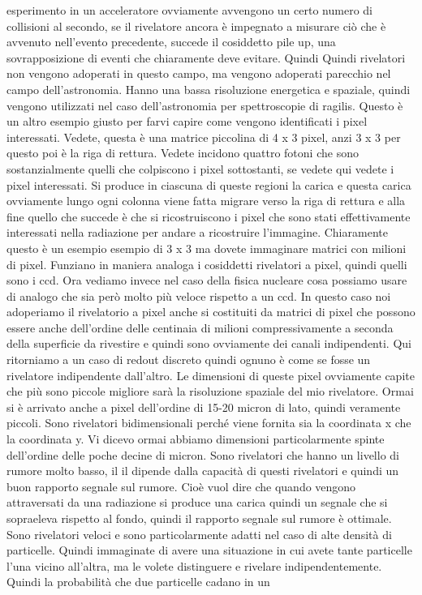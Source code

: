 {esperimento in un acceleratore ovviamente avvengono un certo numero di collisioni al secondo, se il rivelatore ancora è impegnato a misurare ciò che è avvenuto nell'evento precedente, succede il cosiddetto pile up, una sovrapposizione di eventi che chiaramente deve evitare. Quindi Quindi rivelatori non vengono adoperati in questo campo, ma vengono adoperati parecchio nel campo dell'astronomia. Hanno una bassa risoluzione energetica e spaziale, quindi vengono utilizzati nel caso dell'astronomia per spettroscopie di ragilis. Questo è un altro esempio giusto per farvi capire come vengono identificati i pixel interessati. Vedete, questa è una matrice piccolina di 4 x 3 pixel, anzi 3 x 3 per questo poi è la riga di rettura. Vedete incidono quattro fotoni che sono sostanzialmente quelli che colpiscono i pixel sottostanti, se vedete qui vedete i pixel interessati. Si produce in ciascuna di queste regioni la carica e questa carica ovviamente lungo ogni colonna viene fatta migrare verso la riga di rettura e alla fine quello che succede è che si ricostruiscono i pixel che sono stati effettivamente interessati nella radiazione per andare a ricostruire l'immagine. Chiaramente questo è un esempio esempio di 3 x 3 ma dovete immaginare matrici con milioni di pixel. Funziano in maniera analoga i cosiddetti rivelatori a pixel, quindi quelli sono i ccd. Ora vediamo invece nel caso della fisica nucleare cosa possiamo usare di analogo che sia però molto più veloce rispetto a un ccd. In questo caso noi adoperiamo il rivelatorio a pixel anche si costituiti da matrici di pixel che possono essere anche dell'ordine delle centinaia di milioni compressivamente a seconda della superficie da rivestire e quindi sono ovviamente dei canali indipendenti. Qui ritorniamo a un caso di redout discreto quindi ognuno è come se fosse un rivelatore indipendente dall'altro. Le dimensioni di queste pixel ovviamente capite che più sono piccole migliore sarà la risoluzione spaziale del mio rivelatore. Ormai si è arrivato anche a pixel dell'ordine di 15-20 micron di lato, quindi veramente piccoli. Sono rivelatori bidimensionali perché viene fornita sia la coordinata x che la coordinata y. Vi dicevo ormai abbiamo dimensioni particolarmente spinte dell'ordine delle poche decine di micron. Sono rivelatori che hanno un livello di rumore molto basso, il il dipende dalla capacità di questi rivelatori e quindi un buon rapporto segnale sul rumore. Cioè vuol dire che quando vengono attraversati da una radiazione si produce una carica quindi un segnale che si sopraeleva rispetto al fondo, quindi il rapporto segnale sul rumore è ottimale. Sono rivelatori veloci e sono particolarmente adatti nel caso di alte densità di particelle. Quindi immaginate di avere una situazione in cui avete tante particelle l'una vicino all'altra, ma le volete distinguere e rivelare indipendentemente. Quindi la probabilità che due particelle cadano in un 

}
